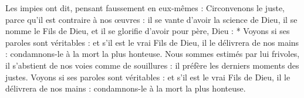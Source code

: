 Les impies ont dit, pensant faussement en eux-mêmes : Circonvenons le juste, parce qu’il est contraire à nos œuvres : il se vante d’avoir la science de Dieu, il se nomme le Fils de Dieu, et il se glorifie d’avoir pour père, Dieu :
* Voyons si ses paroles sont véritables : et s’il est le vrai Fils de Dieu, il le délivrera de nos mains : condamnons-le à la mort la plus honteuse.
\versseparator
Nous sommes estimés par lui frivoles, il s’abstient de nos voies comme de souillures : il préfère les derniers moments des justes.
\versseparator
Voyons si ses paroles sont véritables : et s’il est le vrai Fils de Dieu, il le délivrera de nos mains : condamnons-le à la mort la plus honteuse.